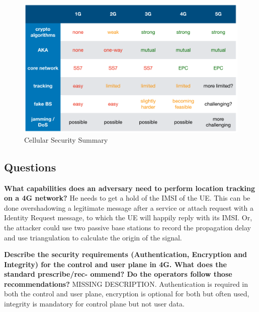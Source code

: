 \begin{figure}[h]
	\centering
	\includegraphics[scale=0.5]{images/10-overview.png}
	\caption{Cellular Security Summary}
	\label{fig:overview}
\end{figure}


\subsection{Questions}

\textbf{What capabilities does an adversary need to perform location tracking on a 4G network?} He needs to get a hold of the IMSI of the UE. This can be done overshadowing a legitimate message after a service or attach request with a Identity Request message, to which the UE will happily reply with its IMSI. Or, the attacker could use two passive base stations to record the propagation delay and use triangulation to calculate the origin of the signal.

\textbf{Describe the security requirements (Authentication, Encryption and Integrity) for the control and user plane in 4G. What does the standard prescribe/rec- ommend? Do the operators follow those recommendations?} MISSING DESCRIPTION. Authentication is required in both the control and user plane, encryption is optional for both but often used, integrity is mandatory for control plane but not user data. 
